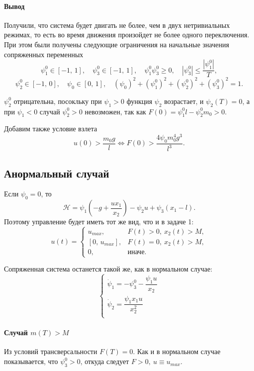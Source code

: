 \documentclass[16pt]{article}
\begin{document}
\paragraph{Вывод} Получили, что система будет двигать не более, чем в двух нетривиальных режимах, то есть
во время движения произойдет не более одного переключения. При этом были получены следующие ограничения на
начальные значения сопряженных переменных
\begin{equation} \label{restr}
\psi_1^0 \in [-1,\, 1], \quad \psi_3^0 \in [-1,\,1],\quad \psi_1^0\psi_3^0 \geqslant 0, 
\quad |\psi_3^0| \leqslant \dfrac{|\psi_1^0|}{T},
\end{equation}
$$\psi_2^0 \in [-1,\, 0], \quad \psi_0 \in [0,\,1], \quad(\psi_0)^2 + (\psi_1^0)^2 + (\psi_2^0)^2 + (\psi_3^0)^2=1.$$

$\psi_2^0$ отрицательна, посокльку при $\psi_1 > 0$ функция $\psi_2$ возрастает, и $\psi_2(T) = 0$, а при
$\psi_1 < 0$ случай $\psi_2^0 > 0$ невозможен, так как $F(0) = \psi_1^0l - \psi_2^0m_0 > 0$.

Добавим также условие взлета
$$u(0) > \dfrac{m_0g}{l} \Leftrightarrow F(0) > \dfrac{4\psi_0m_0^4g^3}{l^3} .$$
\subsection{Анормальный случай}
Если $\psi_0 = 0$, то
$$\mathcal{H} = \psi_1(-g + \dfrac{ux_1}{x_2}) - \psi_2u + \psi_3(x_1-l).$$
Поэтому управление будет иметь тот же вид, что и в задаче 1:
 \begin{equation} \label{oc_1}
 u(t) = 
 \begin{cases}
 u_{max}, & F(t) > 0,\  x_2(t) > M, \\
 [0,\, u_{max}], & F(t) = 0, \ x_2(t) > M, \\
 0, &\text{иначе.}
 \end{cases}
 \end{equation}

Сопряженная система останется такой же, как в нормальном случае:
\begin{equation}
\begin{cases} 
\dot{\psi}_1 = -\psi_3^0 -\dfrac{\psi_1u}{x_2}\\
\dot{\psi}_2 = \dfrac{\psi_1 x_1 u}{x_2^2} \\
\end{cases}
\end{equation}

\paragraph{Случай $m(T) > M$}
Из условий трансверсальности $F(T) = 0$. Как и в нормальном случае показывается, что $\psi_3^0 > 0$, откуда следует
$F > 0, \ u \equiv u_{max}$.
\end{document}
